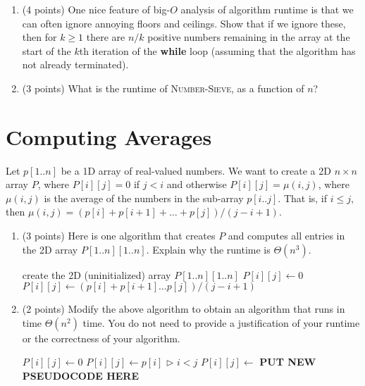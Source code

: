 \documentclass[11pt]{article}
\newcommand{\avg}{\mu}
\begin{document}
\begin{enumerate}
\item (4 points)
One nice feature of big-$O$ analysis of algorithm runtime is that we can
often ignore annoying floors and ceilings.  
Show that if we ignore these, then for $k \ge 1$ there are
$n/k$ positive numbers remaining in the array at the start of the $k$th
iteration of the {\bf while} loop (assuming that the algorithm has not
already terminated).

\item (3 points)
What is the runtime of \textsc{Number-Sieve}, as a function of $n$?

\end{enumerate}

\newpage

\section{Computing Averages}

Let $p[1..n]$ be a 1D array of real-valued numbers.
We want to create a 2D $n \times n$ array $P$, where
$P[i][j] = 0$ if $j < i$ and otherwise
$P[i][j] = \avg(i,j)$, where
$\avg(i,j)$ is the average of the numbers in the sub-array $p[i..j]$.
That is, if $i \le j$, then $\avg(i,j) = (p[i] + p[i+1] + \ldots + p[j])/(j-i+1)$.

\begin{enumerate}
\item (3 points)
  Here is one algorithm that creates $P$ and computes all entries in the 2D array $P[1..n][1..n]$. Explain why the runtime is $\Theta(n^3)$.
  
  \vspace{.1in}
  
  \begin{algorithmic}[1]
\State create the 2D (uninitialized) array $P[1..n][1..n]$
 \State $P[i][j] \gets 0$
\Else
\State $P[i][j] \gets (p[i] + p[i+1] \ldots p[j])/(j-i+1)$
\EndIf
\EndFor
\EndFor
\EndFunction
  \end{algorithmic}
  
  \vspace{.1in}

\item (2 points)
Modify the above algorithm to obtain an algorithm that
  runs in time  $\Theta(n^2)$ time. You do not need to provide a justification of your runtime or the correctness of your algorithm.

  \vspace{.1in}
  
  \begin{algorithmic}[1]
 \State $P[i][j] \gets 0$
 \State $P[i][j] \gets p[i]$
\Else \hspace{.3in} $\triangleright$ $i < j$
\State $P[i][j] \gets$ {\bf PUT NEW PSEUDOCODE HERE}
\EndIf
\EndFor
\EndFor
\EndFunction
  \end{algorithmic}

\end{enumerate}
\end{document}

